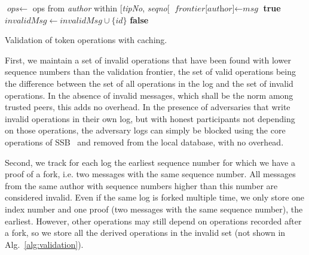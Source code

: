 \documentclass[sigplan,screen,10pt]{acmart}
\begin{document}
\begin{algorithm}
\begin{algorithmic}[1]
       \State
          \State $\textit{ops} \leftarrow $ ops from \textit{author} within [\textit{tipNo}, \textit{seqno}[
           
              \State $\textit{frontier[author]} \leftarrow \textit{msg}$
          \EndIf
           \State \Return \textbf{true}
       \Else
            \State $\textit{invalidMsg} \leftarrow \textit{invalidMsg} \cup \{ id \}$
            \State \Return \textbf{false}
       \EndIf
   \EndProcedure
\end{algorithmic}
\caption{Validation of token operations with caching.}
\label{alg:validation}
\end{algorithm}

First, we maintain a set of invalid operations that have been found with lower sequence numbers than the validation frontier, the set of valid operations being the difference between the set of all operations in the log and the set of invalid operations. In the absence of invalid messages, which shall be the norm among trusted peers, this adds no overhead. In the presence of adversaries that write invalid operations in their own log, but with honest participants not depending on those operations, the adversary logs can simply be blocked using the core operations of SSB~\cite{kermarrec2020gossiping} and removed from the local database, with no overhead.

Second, we track for each log the earliest sequence number for which we have a proof of a fork, i.e. two messages with the same sequence number. All messages from the same author with sequence numbers higher than this number are considered invalid. Even if the same log is forked multiple time, we only store one index number and one proof (two messages with the same sequence number), the earliest. However, other operations may still depend on operations recorded after a fork, so we store all the derived operations in the invalid set (not shown in Alg.~\ref{alg:validation}). 
\end{document}
